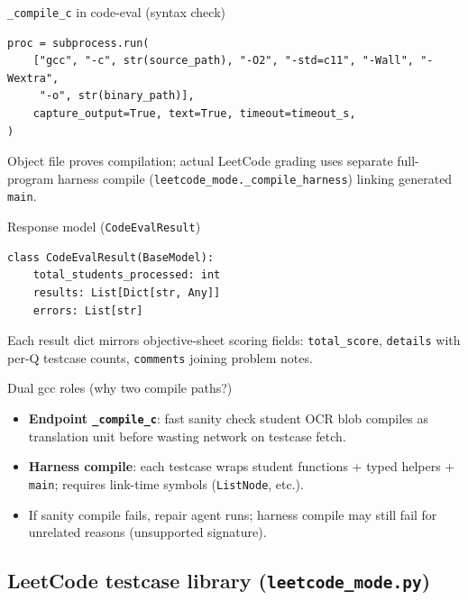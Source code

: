 \documentclass[aspectratio=169]{beamer}
\begin{document}
\begin{frame}[fragile]{\texttt{\_compile\_c} in code-eval (syntax check)}
\begin{lstlisting}[style=py]
proc = subprocess.run(
    ["gcc", "-c", str(source_path), "-O2", "-std=c11", "-Wall", "-Wextra",
     "-o", str(binary_path)],
    capture_output=True, text=True, timeout=timeout_s,
)
\end{lstlisting}
\vfill
\tiny Object file proves compilation; actual LeetCode grading uses separate full-program harness compile (\texttt{leetcode\_mode.\_compile\_harness}) linking generated \texttt{main}.
\end{frame}

\begin{frame}[fragile]{Response model (\texttt{CodeEvalResult})}
\begin{lstlisting}[style=py]
class CodeEvalResult(BaseModel):
    total_students_processed: int
    results: List[Dict[str, Any]]
    errors: List[str]
\end{lstlisting}
\vfill
\tiny Each result dict mirrors objective-sheet scoring fields: \texttt{total\_score}, \texttt{details} with per-Q testcase counts, \texttt{comments} joining problem notes.
\end{frame}

\begin{frame}{Dual gcc roles (why two compile paths?)}
  \small
  \begin{itemize}
    \item \textbf{Endpoint \texttt{\_compile\_c}}: fast sanity check student OCR blob compiles as translation unit before wasting network on testcase fetch.
    \item \textbf{Harness compile}: each testcase wraps student functions + typed helpers + \texttt{main}; requires link-time symbols (\texttt{ListNode}, etc.).
    \item If sanity compile fails, repair agent runs; harness compile may still fail for unrelated reasons (unsupported signature).
  \end{itemize}
\end{frame}

\subsection{LeetCode testcase library (\texttt{leetcode\_mode.py})}
\end{document}
